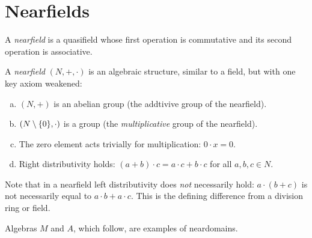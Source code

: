 \section{Nearfields}

\begin{defn}
    A \textsl{nearfield} is a quasifield whose first operation is commutative and its second operation is associative.    
\end{defn}
    
\begin{rem}
    A \textsl{nearfield} $(N,+,\cdot)$ is an algebraic structure, similar to a field, but with one key axiom weakened:
    \begin{enumerate}[a)]
        \item $(N, +)$ is an abelian group (the addtivive group of the nearfield).
        \item $(N \setminus\{0\},\cdot)$ is a group (the \textsl{multiplicative} group of the nearfield).
        \item The zero element acts trivially for multiplication: $0\cdot x=0$.
        \item Right distributivity holds: $(a+b)\cdot c= a\cdot c + b\cdot c$ for all $a,b,c\in N$.
    \end{enumerate}
\end{rem}

\begin{rem}
    Note that in a nearfield left distributivity does \textit{not} necessarily hold: $a\cdot(b+c)$ is not necessarily equal to $a\cdot b + a\cdot c$. This is the defining difference from a division ring or field.
\end{rem}

\begin{xmpl}
        Algebras $M$ and $A$, which follow, are examples of neardomains.
\end{xmpl}